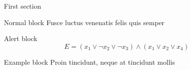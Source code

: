 \documentclass{beamer}
\begin{document}
\begin{frame}{First section}
  \begin{block}{Normal block}
    Fusce luctus venenatis felis quis semper
  \end{block}

  \begin{alertblock}{Alert block}
    $$ E = (x_1 \vee \neg x_2 \vee \neg x_3) \wedge (x_1 \vee x_2 \vee x_4) $$
  \end{alertblock}

  \begin{exampleblock}{Example block}
    Proin tincidunt, neque at tincidunt mollis
  \end{exampleblock}
\end{frame}
\end{document}
